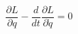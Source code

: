 \documentclass[aspectratio=169]{beamer}
\begin{document}
\begin{wallpaperframe}
\Huge
\[
\frac{\partial L}{\partial q} - \frac{d}{dt}\frac{\partial L}{\partial \dot{q}} = 0
\]
\end{wallpaperframe}
\end{document}
